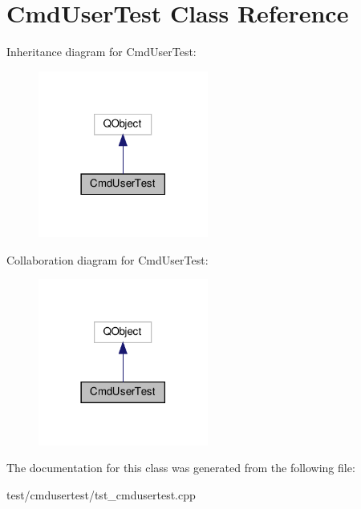 \hypertarget{classCmdUserTest}{}\section{Cmd\+User\+Test Class Reference}
\label{classCmdUserTest}


Inheritance diagram for Cmd\+User\+Test\+:
\nopagebreak
\begin{figure}[H]
\begin{center}
\leavevmode
\includegraphics[width=158pt]{classCmdUserTest__inherit__graph}
\end{center}
\end{figure}


Collaboration diagram for Cmd\+User\+Test\+:
\nopagebreak
\begin{figure}[H]
\begin{center}
\leavevmode
\includegraphics[width=158pt]{classCmdUserTest__coll__graph}
\end{center}
\end{figure}


The documentation for this class was generated from the following file\+:\begin{DoxyCompactItemize}
\item 
test/cmdusertest/tst\+\_\+cmdusertest.\+cpp\end{DoxyCompactItemize}
